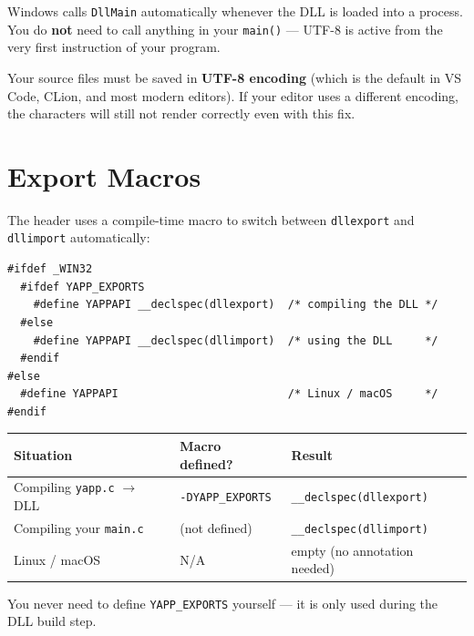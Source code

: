 \documentclass[11pt, a4paper]{article}
\begin{document}
Windows calls \texttt{DllMain} automatically whenever the DLL is loaded into a process.
You do \textbf{not} need to call anything in your \texttt{main()} — UTF-8 is active from the
very first instruction of your program.

\begin{tcolorbox}[notebox]
Your source files must be saved in \textbf{UTF-8 encoding} (which is the default in
VS Code, CLion, and most modern editors). If your editor uses a different encoding,
the characters will still not render correctly even with this fix.
\end{tcolorbox}

\section{Export Macros}

The header uses a compile-time macro to switch between \texttt{dllexport} and
\texttt{dllimport} automatically:

\begin{tcolorbox}[codebox]
\begin{lstlisting}
#ifdef _WIN32
  #ifdef YAPP_EXPORTS
    #define YAPPAPI __declspec(dllexport)  /* compiling the DLL */
  #else
    #define YAPPAPI __declspec(dllimport)  /* using the DLL     */
  #endif
#else
  #define YAPPAPI                          /* Linux / macOS     */
#endif
\end{lstlisting}
\end{tcolorbox}

\begin{center}
\begin{tabular}{l l l}
\toprule
\textbf{Situation}            & \textbf{Macro defined?}    & \textbf{Result} \\
\midrule
Compiling \texttt{yapp.c} $\to$ DLL & \texttt{-DYAPP\_EXPORTS} & \texttt{\_\_declspec(dllexport)} \\
Compiling your \texttt{main.c}       & (not defined)            & \texttt{\_\_declspec(dllimport)} \\
Linux / macOS                        & N/A                      & empty (no annotation needed) \\
\bottomrule
\end{tabular}
\end{center}

You never need to define \texttt{YAPP\_EXPORTS} yourself — it is only used during the
DLL build step.
\end{document}
